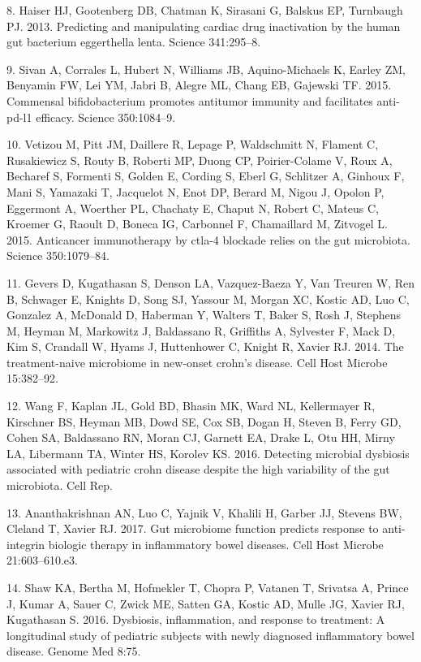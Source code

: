 \documentclass[12pt,]{article}
\begin{document}
\hypertarget{ref-Haiser_cardiac_2013}{}
8. Haiser HJ, Gootenberg DB, Chatman K, Sirasani G, Balskus EP,
Turnbaugh PJ. 2013. Predicting and manipulating cardiac drug
inactivation by the human gut bacterium eggerthella lenta. Science
341:295--8.

\hypertarget{ref-Sivan_cancer_2015}{}
9. Sivan A, Corrales L, Hubert N, Williams JB, Aquino-Michaels K, Earley
ZM, Benyamin FW, Lei YM, Jabri B, Alegre ML, Chang EB, Gajewski TF.
2015. Commensal bifidobacterium promotes antitumor immunity and
facilitates anti-pd-l1 efficacy. Science 350:1084--9.

\hypertarget{ref-Vetizou_cancer_2015}{}
10. Vetizou M, Pitt JM, Daillere R, Lepage P, Waldschmitt N, Flament C,
Rusakiewicz S, Routy B, Roberti MP, Duong CP, Poirier-Colame V, Roux A,
Becharef S, Formenti S, Golden E, Cording S, Eberl G, Schlitzer A,
Ginhoux F, Mani S, Yamazaki T, Jacquelot N, Enot DP, Berard M, Nigou J,
Opolon P, Eggermont A, Woerther PL, Chachaty E, Chaput N, Robert C,
Mateus C, Kroemer G, Raoult D, Boneca IG, Carbonnel F, Chamaillard M,
Zitvogel L. 2015. Anticancer immunotherapy by ctla-4 blockade relies on
the gut microbiota. Science 350:1079--84.

\hypertarget{ref-gevers_pedsCD_2014}{}
11. Gevers D, Kugathasan S, Denson LA, Vazquez-Baeza Y, Van Treuren W,
Ren B, Schwager E, Knights D, Song SJ, Yassour M, Morgan XC, Kostic AD,
Luo C, Gonzalez A, McDonald D, Haberman Y, Walters T, Baker S, Rosh J,
Stephens M, Heyman M, Markowitz J, Baldassano R, Griffiths A, Sylvester
F, Mack D, Kim S, Crandall W, Hyams J, Huttenhower C, Knight R, Xavier
RJ. 2014. The treatment-naive microbiome in new-onset crohn's disease.
Cell Host Microbe 15:382--92.

\hypertarget{ref-wang_pedsCD_2016}{}
12. Wang F, Kaplan JL, Gold BD, Bhasin MK, Ward NL, Kellermayer R,
Kirschner BS, Heyman MB, Dowd SE, Cox SB, Dogan H, Steven B, Ferry GD,
Cohen SA, Baldassano RN, Moran CJ, Garnett EA, Drake L, Otu HH, Mirny
LA, Libermann TA, Winter HS, Korolev KS. 2016. Detecting microbial
dysbiosis associated with pediatric crohn disease despite the high
variability of the gut microbiota. Cell Rep.

\hypertarget{ref-Ananthakrishnan_IBD_2017}{}
13. Ananthakrishnan AN, Luo C, Yajnik V, Khalili H, Garber JJ, Stevens
BW, Cleland T, Xavier RJ. 2017. Gut microbiome function predicts
response to anti-integrin biologic therapy in inflammatory bowel
diseases. Cell Host Microbe 21:603--610.e3.

\hypertarget{ref-Shaw_response_2016}{}
14. Shaw KA, Bertha M, Hofmekler T, Chopra P, Vatanen T, Srivatsa A,
Prince J, Kumar A, Sauer C, Zwick ME, Satten GA, Kostic AD, Mulle JG,
Xavier RJ, Kugathasan S. 2016. Dysbiosis, inflammation, and response to
treatment: A longitudinal study of pediatric subjects with newly
diagnosed inflammatory bowel disease. Genome Med 8:75.
\end{document}
